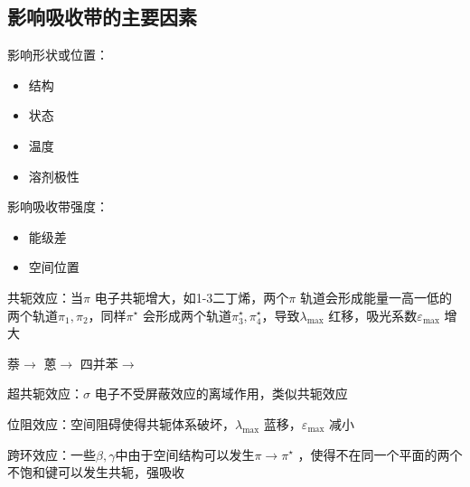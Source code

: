 \subsection{影响吸收带的主要因素}%
\label{sub:影响吸收带的主要因素}
影响形状或位置：
\begin{itemize}
    \item 结构
    \item 状态
    \item 温度
    \item 溶剂极性
    
\end{itemize}
影响吸收带强度：
\begin{itemize}
    \item 能级差
    \item 空间位置
    
\end{itemize}
\begin{notation}
    共轭效应：当$\pi $ 电子共轭增大，如1-3二丁烯，两个$\pi $ 轨道会形成能量一高一低的两个轨道$\pi_1,\pi_2$，同样$\pi ^\star $ 会形成两个轨道$\pi ^\star_3, \pi ^\star_4$，导致$\lambda_\text{max}$ 红移，吸光系数$\varepsilon_\text{max}$ 增大
\end{notation}
\begin{eg}
    萘$\to $ 蒽$\to $ 四并苯$\to $
\end{eg}
\begin{notation}
    超共轭效应：$\sigma$ 电子不受屏蔽效应的离域作用，类似共轭效应

    位阻效应：空间阻碍使得共轭体系破坏，$\lambda_\text{max}$ 蓝移，$\varepsilon_\text{max}$ 减小
\end{notation}
\begin{notation}
    跨环效应：一些$\beta,\gamma$中由于空间结构可以发生$\pi \to \pi ^\star $ ，使得不在同一个平面的两个不饱和键可以发生共轭，强吸收
\end{notation}

